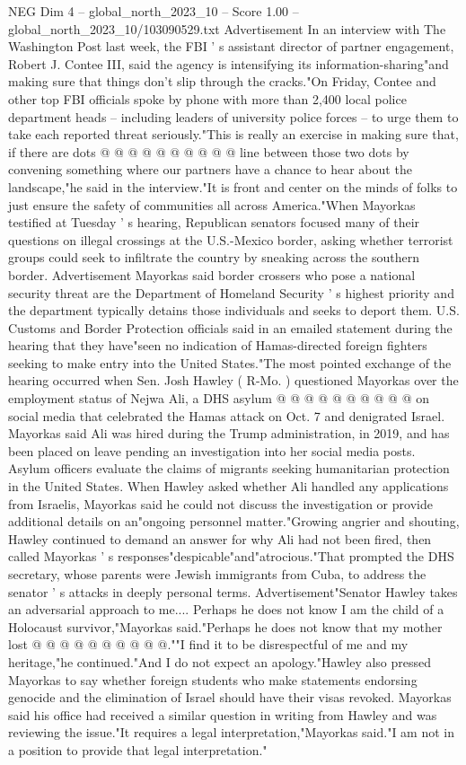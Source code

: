 \begin{textsample}{NEG Dim 4 – global\_north\_2023\_10 – Score 1.00 – global\_north\_2023\_10/103090529.txt}
Advertisement In an interview with The Washington Post last week, the FBI ' s assistant director of partner engagement, Robert J.
Contee III, said the agency is intensifying its information-sharing"and making sure that things don't slip through the cracks."On Friday, Contee and other top FBI officials spoke by phone with more than 2,400 local police department heads -- including leaders of university police forces -- to urge them to take each reported threat seriously."This is really an exercise in making sure that, if there are dots @ @ @ @ @ @ @ @ @ @ line between those two dots by convening something where our partners have a chance to hear about the landscape,"he said in the interview."It is front and center on the minds of folks to just ensure the safety of communities all across America."When Mayorkas testified at Tuesday ' s hearing, Republican senators focused many of their questions on illegal crossings at the U.S.-Mexico border, asking whether terrorist groups could seek to infiltrate the country by sneaking across the southern border.
Advertisement Mayorkas said border crossers who pose a national security threat are the Department of Homeland Security ' s highest priority and the department typically detains those individuals and seeks to deport them.
U.S.
Customs and Border Protection officials said in an emailed statement during the hearing that they have"seen no indication of Hamas-directed foreign fighters seeking to make entry into the United States."The most pointed exchange of the hearing occurred when Sen.
Josh Hawley ( R-Mo. ) questioned Mayorkas over the employment status of Nejwa Ali, a DHS asylum @ @ @ @ @ @ @ @ @ @ on social media that celebrated the Hamas attack on Oct. 7 and denigrated Israel.
Mayorkas said Ali was hired during the Trump administration, in 2019, and has been placed on leave pending an investigation into her social media posts.
Asylum officers evaluate the claims of migrants seeking humanitarian protection in the United States.
When Hawley asked whether Ali handled any applications from Israelis, Mayorkas said he could not discuss the investigation or provide additional details on an"ongoing personnel matter."Growing angrier and shouting, Hawley continued to demand an answer for why Ali had not been fired, then called Mayorkas ' s responses"despicable"and"atrocious."That prompted the DHS secretary, whose parents were Jewish immigrants from Cuba, to address the senator ' s attacks in deeply personal terms.
Advertisement"Senator Hawley takes an adversarial approach to me....
Perhaps he does not know I am the child of a Holocaust survivor,"Mayorkas said."Perhaps he does not know that my mother lost @ @ @ @ @ @ @ @ @ @.""I find it to be disrespectful of me and my heritage,"he continued."And I do not expect an apology."Hawley also pressed Mayorkas to say whether foreign students who make statements endorsing genocide and the elimination of Israel should have their visas revoked.
Mayorkas said his office had received a similar question in writing from Hawley and was reviewing the issue."It requires a legal interpretation,"Mayorkas said."I am not in a position to provide that legal interpretation."

\end{textsample}
